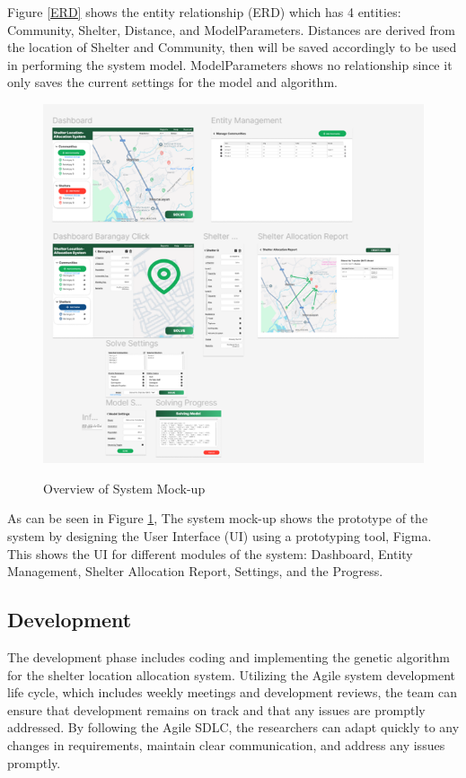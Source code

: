 	Figure \ref{ERD} shows the entity relationship (ERD) which has 4 entities: Community, Shelter, Distance, and ModelParameters. Distances are derived from the location of Shelter and Community, then will be saved accordingly to be used in performing the system model. ModelParameters shows no relationship since it only saves the current settings for the model and algorithm.
	
	\begin{figure}[h!]
		\caption{Overview of System Mock-up}
		\centering
		\includegraphics[width=\textwidth]{SYSTEM MOCKUP}
		\label{Mockup}
	\end{figure}
	
	As can be seen in Figure \ref{Mockup}, The system mock-up shows the prototype of the system by designing the User Interface (UI) using a prototyping tool, Figma. This shows the UI for different modules of the system: Dashboard, Entity Management, Shelter Allocation Report, Settings, and the Progress.

\subsection{Development}
	The development phase includes coding and implementing the genetic algorithm for the shelter location allocation system. Utilizing the Agile system development life cycle, which includes weekly meetings and development reviews, the team can ensure that development remains on track and that any issues are promptly addressed. By following the Agile SDLC, the researchers can adapt quickly to any changes in requirements, maintain clear communication, and address any issues promptly.
	
